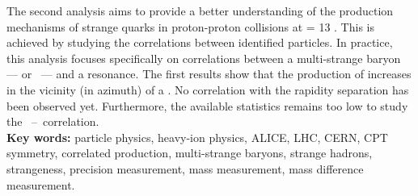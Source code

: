 The second analysis aims to provide a better understanding of the production mechanisms of strange quarks in proton-proton collisions at \sqrtS = 13 \tev. This is achieved by studying the correlations between identified particles. In practice, this analysis focuses specifically on correlations between a multi-strange baryon --- \rmXiPM or \rmOmegaPM\ --- and a \rmPhiMes resonance. The first results show that the production of \rmPhiMes increases in the vicinity (in azimuth) of a \rmXiPM. No correlation with the rapidity separation has been observed yet. Furthermore, the available statistics remains too low to study the \rmOmega\ --\ \rmPhiMes correlation.\\

\noindent\textbf{Key words:} particle physics, heavy-ion physics, ALICE, LHC, CERN, CPT symmetry, correlated production, multi-strange baryons, strange hadrons, strangeness, precision measurement, mass measurement, mass difference measurement.



    

